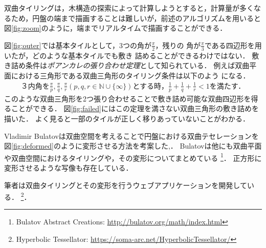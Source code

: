 双曲タイリングは，木構造の探索によって計算しようとすると，計算量が多くな
るため，円盤の端まで描画することは難しいが，前述のアルゴリズムを用いると
図\ref{fig:zoom}のように，端までリアルタイムで描画することができる．

図\ref{fig:outer}では基本タイルとして，3つの角が$\frac{\pi}{2}$，残りの
角が$\frac{\pi}{3}$である四辺形を用いたが，どのような基本タイルでも敷き
詰めることができるわけではない．
敷き詰め条件は\emph{ポアンカレの張り合わせ定理}として知られている．
例えば双曲平面における三角形である双曲三角形のタイリング条件は以下のよう
になる．
\begin{eqnarray*}
\text{３内角を}\frac{\pi}{p},\frac{\pi}{q},\frac{\pi}{r} (p, q, r \in
 \mathbb{N} \cup \{\infty\}) \text{とする時，}
 \frac{1}{p} + \frac{1}{q} + \frac{1}{r} < 1 \text{を満たす．}
\end{eqnarray*}
このような双曲三角形を2つ張り合わせることで敷き詰め可能な双曲四辺形を得
ることができる．
図\ref{fig:failed}にはこの定理を満さない双曲三角形の敷き詰めを描いた．
よく見ると一部のタイルが正しく移りあっていないことがわかる．

Vladimir Bulatovは双曲空間を考えることで円盤における双曲テセレーションを
図\ref{fig:deformed}のように変形させる方法を考案した\cite{bridges2013-167},\cite{bridges2011-479}．
Bulatovは他にも双曲平面や双曲空間におけるタイリングや，その変形についてまとめている
\footnote{Bulatov Abstract Creations: \url{http://bulatov.org/math/index.html}}．
正方形に変形させるような写像も存在している\cite{bridges2016-179}．

筆者は双曲タイリングとその変形を行うウェブアプリケーションを開発している．
\footnote{Hyperbolic Tessellator: \url{https://soma-arc.net/HyperbolicTessellator/}}．

